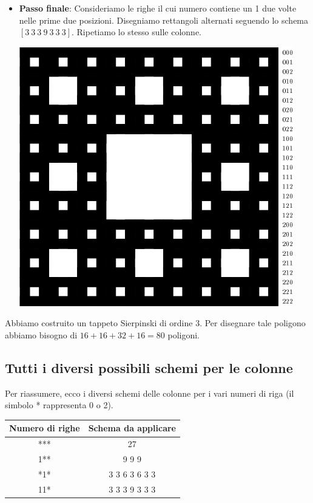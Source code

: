 \begin{itemize}
\begin{center}
	\end{center}
	\item [\textbullet] \textbf{Passo finale}: Consideriamo le righe il cui numero contiene un 1 due volte nelle prime due posizioni. Disegniamo rettangoli alternati seguendo lo schema $[3\ 3\ 3\ 9\ 3\ 3\ 3]$. Ripetiamo lo stesso sulle colonne.
	\begin{center}
		\includegraphics{pics/menger-schema06.png}
	\end{center}
\end{itemize}
Abbiamo costruito un tappeto Sierpinski di ordine 3. Per disegnare tale poligono abbiamo bisogno di $16+16+32+16=80$ poligoni.



\subsection{Tutti i diversi possibili schemi per le colonne}
Per riassumere, ecco i diversi schemi delle colonne per i vari numeri di riga (il simbolo * rappresenta 0 o 2).
\begin{center}
	\begin{tabular}{|c|c|}
		\hline
		Numero di righe & Schema da applicare\\
		\hline
		*** & 27 \\ 
		\hline
		1** &  9 9 9 \\
		\hline
		*1* & 3 3 6 3 6 3 3\\
		\hline
		11* & 3 3 3 9 3 3 3\\
		\hline
	\end{tabular}
\end{center}

